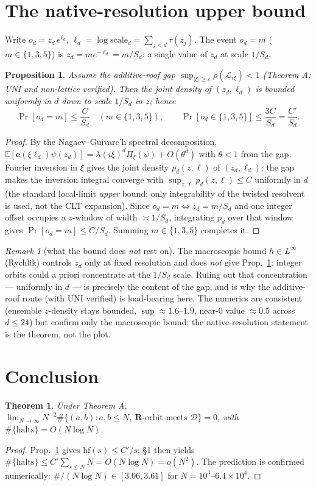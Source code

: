 \documentclass[11pt]{article}
\newtheorem{theorem}{Theorem}\newtheorem{lemma}{Lemma}\newtheorem{proposition}{Proposition}
\theoremstyle{remark}\newtheorem{remark}{Remark}
\newcommand{\R}{\mathbf{R}}\newcommand{\D}{\mathcal D}\newcommand{\Lop}{\mathcal L}\newcommand{\e}{\mathbf e}
\begin{document}
\section{The native-resolution upper bound}
Write $o_d=z_d\,e^{\ell_d}$, $\ell_d=\log\mathrm{scale}_d=\sum_{j<d}\tau(z_j)$.
The event $o_d=m$ ($m\in\{1,3,5\}$) is $z_d=m e^{-\ell_d}=m/S_d$: a single
value of $z_d$ at scale $1/S_d$.
\begin{proposition}\label{p:ub}
Assume the additive-roof gap $\sup_{|\xi|\ge\varepsilon}\rho(\Lop_{i\xi})<1$
\emph{(Theorem A; UNI and non-lattice verified)}. Then the joint density of
$(z_d,\ell_d)$ is bounded uniformly in $d$ down to scale $1/S_d$ in $z$; hence
\[
\Pr[o_d=m]\le \frac{C}{S_d}\quad(m\in\{1,3,5\}),\qquad
\Pr[o_d\in\{1,3,5\}]\le\frac{3C}{S_d}=\frac{C'}{S_d}.
\]
\end{proposition}
\begin{proof}
By the Nagaev--Guivarc'h spectral decomposition,
$\mathbb E[\e(\xi\ell_d)\psi(z_d)]=\lambda(i\xi)^d\Pi_\xi(\psi)+O(\theta^d)$
with $\theta<1$ from the gap. Fourier inversion in $\xi$ gives the joint
density $p_d(z,\ell)$ of $(z_d,\ell_d)$; the gap makes the inversion integral
converge with $\sup_{z,\ell}p_d(z,\ell)\le C$ uniformly in $d$ (the standard
local-limit \emph{upper} bound; only integrability of the twisted resolvent is
used, not the CLT expansion). Since $o_d=m\iff z_d=m/S_d$ and one integer
offset occupies a $z$-window of width $\asymp1/S_d$, integrating $p_d$ over
that window gives $\Pr[o_d=m]\le C/S_d$. Summing $m\in\{1,3,5\}$ completes it.
\end{proof}

\begin{remark}[what the bound does \emph{not} rest on]
The macroscopic bound $h\in L^\infty$ (Rychlik) controls $z_d$ only at fixed
resolution and does \emph{not} give Prop.~\ref{p:ub}: integer orbits could a
priori concentrate at the $1/S_d$ scale. Ruling out that concentration ---
uniformly in $d$ --- is precisely the content of the gap, and is why the
additive-roof route (with UNI verified) is load-bearing here. The numerics are
consistent (ensemble $z$-density stays bounded, $\sup\approx1.6$–$1.9$, near-0
value $\approx0.5$ across $d\le24$) but confirm only the macroscopic bound; the
native-resolution statement is the theorem, not the plot.
\end{remark}

\section{Conclusion}
\begin{theorem}\label{t:main}
Under Theorem A, $\displaystyle\lim_{N\to\infty}N^{-2}\#\{(a,b):a,b\le N,\
\R\text{-orbit meets }\D\}=0$, with $\#\{\text{halts}\}=O(N\log N)$.
\end{theorem}
\begin{proof}
Prop.~\ref{p:ub} gives $\mathrm{hf}(s)\le C'/s$; \S1 then yields
$\#\{\text{halts}\}\le C'\sum_{s\le N}N=O(N\log N)=o(N^2)$. The prediction is
confirmed numerically: $\#/(N\log N)\in[3.06,3.61]$ for $N=10^3$–$6.4\times10^4$.
\end{proof}
\end{document}
